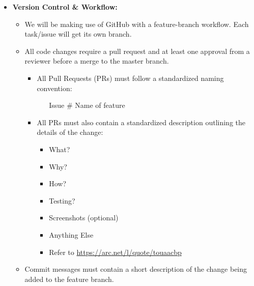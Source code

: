 \documentclass{article}
\begin{document}
\begin{itemize}
    \item \textbf{Version Control \& Workflow:}
    \begin{itemize}
        \item We will be making use of GitHub with a feature-branch workflow. Each task/issue will get its own branch.
        \item All code changes require a pull request and at least one approval from a reviewer before a merge to the master branch.
        \begin{itemize}
            \item All Pull Requests (PRs) must follow a standardized naming convention:
            \begin{itemize}
                \item [Issue \#] Name of feature
            \end{itemize}
            \item All PRs must also contain a standardized description outlining the details of the change:
            \begin{itemize}
                \item  What?
                \item  Why?
                \item  How?
                \item  Testing?
                \item  Screenshots (optional)
                \item  Anything Else
                \item Refer to \url{https://arc.net/l/quote/touaacbp}
            \end{itemize}
        \end{itemize}
        \item Commit messages must contain a short description of the change being added to the feature branch.
    \end{itemize}


\end{itemize}
\end{document}
